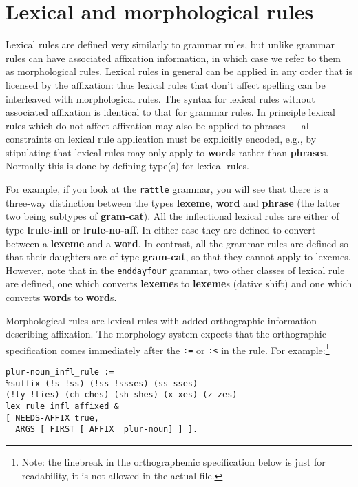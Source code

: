 \documentclass[12pt]{report}
\begin{document}
\section{Lexical and morphological rules}
\label{lrules}

Lexical rules are defined very similarly to grammar rules, but 
unlike grammar rules can have associated affixation information,
in which case we refer to them as morphological rules.
Lexical rules in general can be applied in any order that is
licensed by the affixation: thus lexical rules that don't
affect spelling can be interleaved with morphological rules.
The syntax for lexical rules without associated affixation
is identical to that for grammar rules.
In principle
lexical rules which do not affect affixation
may also be applied to phrases ---
all constraints on lexical rule application must be explicitly encoded,
e.g., by stipulating that lexical rules may only apply
to {\bf word}s rather than {\bf phrase}s.
Normally this is done by defining type(s) for lexical rules.

For example, if you look at the {\tt rattle} grammar, you will see that
there is a three-way distinction between the types {\bf lexeme},
{\bf word} and {\bf phrase} (the latter two being subtypes of
{\bf gram-cat}).
All the inflectional lexical rules
are either of type {\bf lrule-infl} or {\bf lrule-no-aff}.  In either
case they are defined to convert between a {\bf lexeme} and a {\bf word}.
In contrast, all the grammar rules are defined so that their daughters
are of type {\bf gram-cat}, so that they cannot apply to lexemes.
However, note that in the {\tt enddayfour} grammar, two other classes
of lexical rule are defined, one which converts {\bf lexeme}s to 
{\bf lexeme}s (dative shift) and one which converts {\bf word}s to
{\bf word}s.  

Morphological rules are lexical
rules with added orthographic
information describing affixation.
The morphology system expects that the
orthographic specification comes immediately after the 
{\tt :=} or {\tt :<} in the rule.
For example:\footnote{Note: the linebreak 
in the orthographemic specification below is just for readability,
it is not allowed in the actual file.}
\begin{verbatim}
plur-noun_infl_rule :=
%suffix (!s !ss) (!ss !ssses) (ss sses) 
(!ty !ties) (ch ches) (sh shes) (x xes) (z zes)
lex_rule_infl_affixed &
[ NEEDS-AFFIX true,
  ARGS [ FIRST [ AFFIX  plur-noun] ] ].
\end{verbatim}
\end{document}
